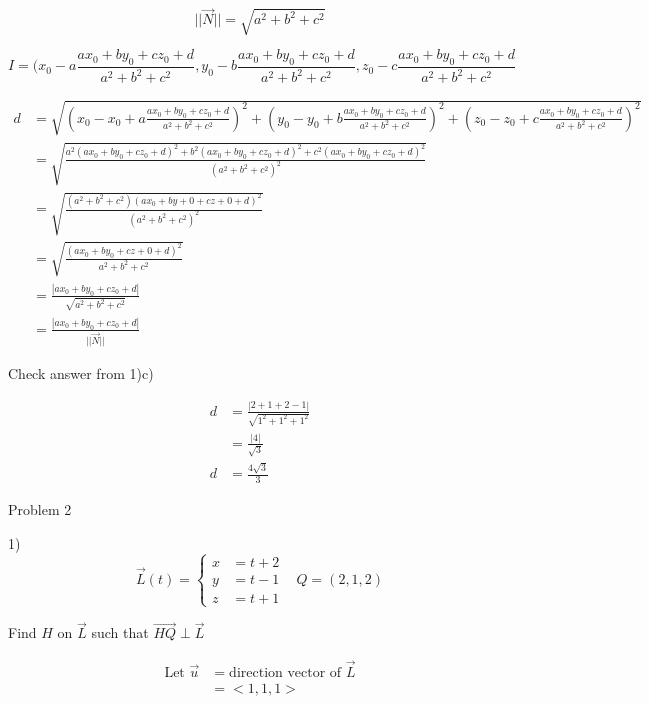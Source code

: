 \documentclass{article}
\begin{document}
$$
||\vec{N}|| = \sqrt{a^2+b^2+c^2}
$$

$$
I = (x_0-a\frac{ax_0 + by_0 + cz_0 + d}{a^2 + b^2 + c^2}, y_0-b\frac{ax_0 + by_0 + cz_0 + d}{a^2 + b^2 + c^2}, z_0-c\frac{ax_0 + by_0 + cz_0 + d}{a^2 + b^2 + c^2}
$$

\begin{align*}
d &= \sqrt{(x_0 - x_0 + a\frac{ax_0 + by_0 + cz_0 + d}{a^2 + b^2 + c^2})^2 + (y_0 - y_0 + b\frac{ax_0 + by_0 + cz_0 + d}{a^2 + b^2 + c^2})^2 + (z_0 - z_0 + c\frac{ax_0 + by_0 + cz_0 + d}{a^2 + b^2 + c^2})^2} \\
&= \sqrt{\frac{a^2(ax_0+by_0+cz_0+d)^2 + b^2(ax_0+by_0+cz_0+d)^2 + c^2(ax_0+by_0+cz_0+d)^2}{(a^2 + b^2 + c^2)^2}} \\
&= \sqrt{\frac{(a^2 + b^2 + c^2)(ax_0+by+0+cz+0+d)^2}{(a^2 + b^2 + c^2)^2}} \\
&= \sqrt{\frac{(ax_0 + by_0 + cz+0 +d)^2}{a^2 + b^2 + c^2}} \\
&= \frac{|ax_0 + by_0 + cz_0 + d|}{\sqrt{a^2+b^2+c^2}} \\
&= \frac{|ax_0 + by_0 + cz_0 + d|}{||\vec{N}||}
\end{align*}

\begin{text}
\newline
Check answer from 1)c)
\end{text}

\begin{align*}
d &= \frac{| 2 + 1 + 2 - 1 |}{\sqrt{1^2 + 1^2 + 1^2}} \\
&= \frac{| 4 |}{\sqrt{3}} \\
d &= \frac{4\sqrt{3}}{3}
\end{align*}



\begin{text}
Problem 2
\end{text}

1)
\[\vec{L}(t) = \left\{
  \begin{array}{lr}
    x &= t + 2 \\
    y &= t - 1 \\
    z &= t + 1
  \end{array}
\right.
\;\;\;
Q = (2,1,2)
\]

\begin{center}
Find $H$ on $\vec{L}$ such that $\vec{HQ} \perp \vec{L}$
\end{center}

\begin{align*}
\text{Let } \vec{u} &= \text{direction vector of } \vec{L} \\
&= <1,1,1>
\end{align*}
\end{document}
